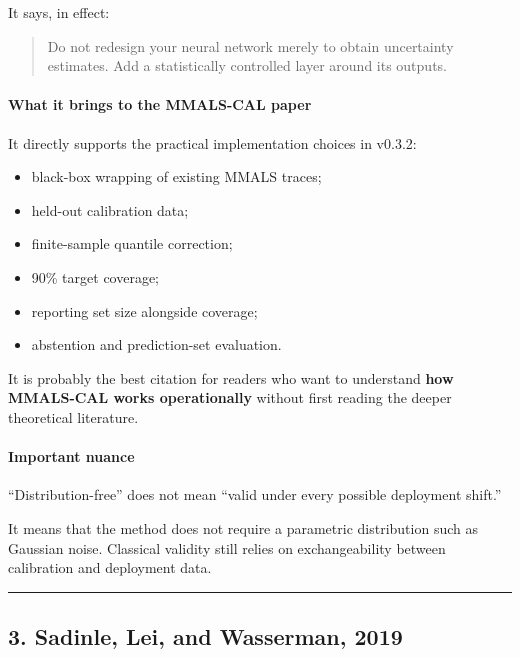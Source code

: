 It says, in effect:

\begin{quote}
Do not redesign your neural network merely to obtain uncertainty estimates. Add a statistically controlled layer around its outputs.
\end{quote}

\paragraph{What it brings to the MMALS-CAL paper}\label{what-it-brings-to-the-mmals-cal-paper-1}

It directly supports the practical implementation choices in v0.3.2:

\begin{itemize}
\tightlist
\item
  black-box wrapping of existing MMALS traces;
\item
  held-out calibration data;
\item
  finite-sample quantile correction;
\item
  90\% target coverage;
\item
  reporting set size alongside coverage;
\item
  abstention and prediction-set evaluation.
\end{itemize}

It is probably the best citation for readers who want to understand \textbf{how MMALS-CAL works operationally} without first reading the deeper theoretical literature.

\paragraph{Important nuance}\label{important-nuance}

``Distribution-free'' does not mean ``valid under every possible deployment shift.''

It means that the method does not require a parametric distribution such as Gaussian noise. Classical validity still relies on exchangeability between calibration and deployment data.

\begin{center}\rule{0.5\linewidth}{0.5pt}\end{center}

\subsection{3. Sadinle, Lei, and Wasserman, 2019}\label{sadinle-lei-and-wasserman-2019}


